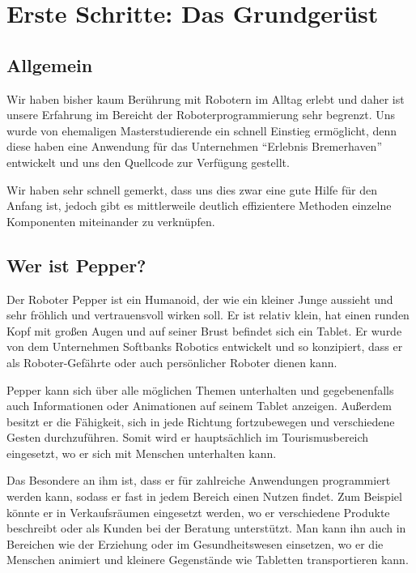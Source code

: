 \newcommand{\chaptergrundgeruest}{Kapitel 3. }

\chapter{Erste Schritte: Das Grundgerüst}
\label{sec:erste-schritte-und-installation}
\lhead{\chaptergrundgeruest \emph{Erste Schritte: Das Grundgerüst}}

\section{Allgemein}
Wir haben bisher kaum Berührung mit Robotern im Alltag erlebt und daher ist unsere Erfahrung im Bereicht der Roboterprogrammierung sehr begrenzt. Uns wurde von ehemaligen Masterstudierende ein schnell Einstieg ermöglicht, denn diese haben eine Anwendung für das Unternehmen ``Erlebnis Bremerhaven'' entwickelt und uns den Quellcode zur Verfügung gestellt.

Wir haben sehr schnell gemerkt, dass uns dies zwar eine gute Hilfe für den Anfang ist, jedoch gibt es mittlerweile deutlich effizientere Methoden einzelne Komponenten miteinander zu verknüpfen.\\

\section{Wer ist Pepper?}

Der Roboter Pepper ist ein Humanoid, der wie ein kleiner Junge aussieht und sehr fröhlich und vertrauensvoll wirken soll. Er ist relativ klein, hat einen runden Kopf mit großen Augen und auf seiner Brust befindet sich ein Tablet. Er wurde von dem Unternehmen Softbanks Robotics entwickelt und so konzipiert, dass er als Roboter-Gefährte oder auch persönlicher Roboter dienen kann.

Pepper kann sich über alle möglichen Themen unterhalten und gegebenenfalls auch Informationen oder Animationen auf seinem Tablet anzeigen. Außerdem besitzt er die Fähigkeit, sich in jede Richtung fortzubewegen und verschiedene Gesten durchzuführen. Somit wird er hauptsächlich im Tourismusbereich eingesetzt, wo er sich mit Menschen unterhalten kann.

Das Besondere an ihm ist, dass er für zahlreiche Anwendungen programmiert werden kann, sodass er fast in jedem Bereich einen Nutzen findet. Zum Beispiel könnte er in Verkaufsräumen eingesetzt werden, wo er verschiedene Produkte beschreibt oder als Kunden bei der Beratung unterstützt. Man kann ihn auch in Bereichen wie der Erziehung oder im Gesundheitswesen einsetzen, wo er die Menschen animiert und kleinere Gegenstände wie Tabletten transportieren kann.

